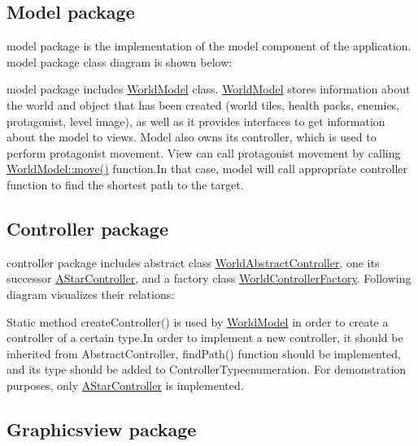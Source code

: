 \subsection*{Model package}

{\ttfamily model} package is the implementation of the model component of the application. {\ttfamily model} package class diagram is shown below\+:



{\ttfamily model} package includes {\ttfamily \hyperlink{classWorldModel}{World\+Model}} class. {\ttfamily \hyperlink{classWorldModel}{World\+Model}} stores information about the world and object that has been created (world tiles, health packs, enemies, protagonist, level image), as well as it provides interfaces to get information about the model to views. Model also owns its controller, which is used to perform protagonist movement. View can call protagonist movement by calling {\ttfamily \hyperlink{classWorldModel_ae02716d99230f6edb0f7caf5b469bc1c}{World\+Model\+::move()}} function.\+In that case, model will call appropriate controller function to find the shortest path to the target.

\subsection*{Controller package}

{\ttfamily controller} package includes abstract class {\ttfamily \hyperlink{classWorldAbstractController}{World\+Abstract\+Controller}}, one its successor {\ttfamily \hyperlink{classAStarController}{A\+Star\+Controller}}, and a factory class {\ttfamily \hyperlink{classWorldControllerFactory}{World\+Controller\+Factory}}. Following diagram visualizes their relations\+:



Static method {\ttfamily create\+Controller()} is used by \hyperlink{classWorldModel}{World\+Model} in order to create a controller of a certain type.\+In order to implement a new controller, it should be inherited from {\ttfamily Abstract\+Controller}, {\ttfamily find\+Path()} function should be implemented, and its type should be added to {\ttfamily Controller\+Type}enumeration. For demonstration purposes, only {\ttfamily \hyperlink{classAStarController}{A\+Star\+Controller}} is implemented.

\subsection*{Graphicsview package}

